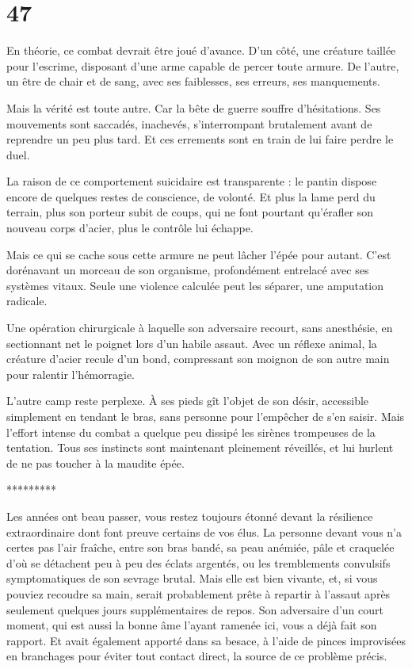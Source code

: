 \documentclass{report}
\newcommand{\gsection}[1]{
    \section{#1}
    \label{section-#1}
}
\newcommand{\ellipse}{
    \begin{center}
        *********
    \end{center}
}
\begin{document}
\gsection{47}

En théorie, ce combat devrait être joué d'avance. D'un côté, une créature taillée pour l'escrime, disposant d'une arme capable de percer toute armure. De l'autre, un être de chair et de sang, avec ses faiblesses, ses erreurs, ses manquements.

Mais la vérité est toute autre. Car la bête de guerre souffre d'hésitations. Ses mouvements sont saccadés, inachevés, s'interrompant brutalement avant de reprendre un peu plus tard. Et ces errements sont en train de lui faire perdre le duel.

La raison de ce comportement suicidaire est transparente : le pantin dispose encore de quelques restes de conscience, de volonté. Et plus la lame perd du terrain, plus son porteur subit de coups, qui ne font pourtant qu'érafler son nouveau corps d'acier, plus le contrôle lui échappe.

Mais ce qui se cache sous cette armure ne peut lâcher l'épée pour autant. C'est dorénavant un morceau de son organisme, profondément entrelacé avec ses systèmes vitaux. Seule une violence calculée peut les séparer, une amputation radicale.

Une opération chirurgicale à laquelle son adversaire recourt, sans anesthésie, en sectionnant net le poignet lors d'un habile assaut. Avec un réflexe animal, la créature d'acier recule d'un bond, compressant son moignon de son autre main pour ralentir l'hémorragie.

L'autre camp reste perplexe. À ses pieds gît l'objet de son désir, accessible simplement en tendant le bras, sans personne pour l'empêcher de s'en saisir. Mais l'effort intense du combat a quelque peu dissipé les sirènes trompeuses de la tentation. Tous ses instincts sont maintenant pleinement réveillés, et lui hurlent de ne pas toucher à la maudite épée.

\ellipse

Les années ont beau passer, vous restez toujours étonné devant la résilience extraordinaire dont font preuve certains de vos élus. La personne devant vous n'a certes pas l'air fraîche, entre son bras bandé, sa peau anémiée, pâle et craquelée d'où se détachent peu à peu des éclats argentés, ou les tremblements convulsifs symptomatiques de son sevrage brutal. Mais elle est bien vivante, et, si vous pouviez recoudre sa main, serait probablement prête à repartir à l'assaut après seulement quelques jours supplémentaires de repos. Son adversaire d'un court moment, qui est aussi la bonne âme l'ayant ramenée ici, vous a déjà fait son rapport. Et avait également apporté dans sa besace, à l'aide de pinces improvisées en branchages pour éviter tout contact direct, la source de ce problème précis.
\end{document}
